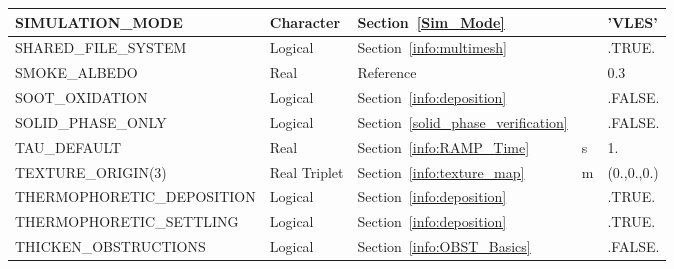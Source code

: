\documentclass[11pt]{book}
\begin{document}
\begin{longtable}{@{\extracolsep{\fill}}|l|l|l|l|l|}
{\ct SIMULATION\_MODE}                          & Character     & Section~\ref{Sim_Mode}                                &               & {\ct 'VLES'}      \\ \hline
{\ct SHARED\_FILE\_SYSTEM}                      & Logical       & Section~\ref{info:multimesh}                          &               & {\ct .TRUE.}      \\ \hline
{\ct SMOKE\_ALBEDO}                             & Real          & Reference~\cite{Smokeview_Users_Guide}                &               & 0.3               \\ \hline
{\ct SOOT\_OXIDATION}                           & Logical       & Section~\ref{info:deposition}                         &               & {\ct .FALSE.}      \\ \hline
{\ct SOLID\_PHASE\_ONLY}                        & Logical       & Section~\ref{solid_phase_verification}                &               & {\ct .FALSE.}     \\ \hline
{\ct TAU\_DEFAULT}                              & Real          & Section~\ref{info:RAMP_Time}                          & s             & 1.                \\ \hline
{\ct TEXTURE\_ORIGIN(3)}                        & Real Triplet  & Section~\ref{info:texture_map}                        & m             & (0.,0.,0.)        \\ \hline
{\ct THERMOPHORETIC\_DEPOSITION}                & Logical       & Section~\ref{info:deposition}                         &               & {\ct .TRUE.}      \\ \hline
{\ct THERMOPHORETIC\_SETTLING}                  & Logical       & Section~\ref{info:deposition}                         &               & {\ct .TRUE.}      \\ \hline
{\ct THICKEN\_OBSTRUCTIONS}                     & Logical       & Section~\ref{info:OBST_Basics}                        &               & {\ct .FALSE.}     \\ \hline

\end{longtable}
\end{document}
